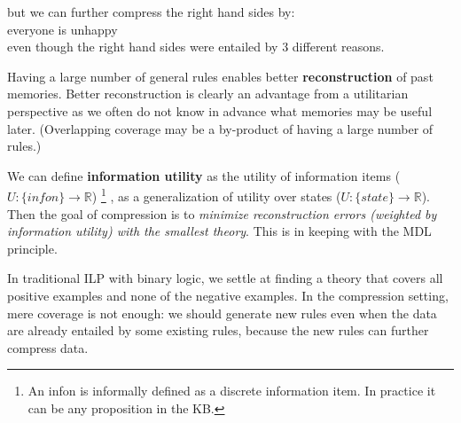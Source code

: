 but we can further compress the right hand sides by:\\
\hspace*{1cm} everyone is unhappy\\
even though the right hand sides were entailed by 3 different reasons.

Having a large number of general rules enables better \textbf{reconstruction} of past memories.  Better reconstruction is clearly an advantage from a utilitarian perspective as we often do not know in advance what memories may be useful later.  (Overlapping coverage may be a by-product of having a large number of rules.)

We can define \textbf{information utility} as the utility of information items ($U: \{ infon \} \rightarrow \mathbb{R}$)
\footnote{An infon is informally defined as a discrete information item.  In practice it can be any proposition in the KB.}
, as a generalization of utility over states ($U: \{ state \} \rightarrow \mathbb{R}$).  Then the goal of compression is to \textit{minimize reconstruction errors (weighted by information utility) with the smallest theory}.  This is in keeping with the MDL principle.



In traditional ILP with binary logic, we settle at finding a theory that covers all positive examples and none of the negative examples.  In the compression setting, mere coverage is not enough:  we should generate new rules even when the data are already entailed by some existing rules, because the new rules can further compress data.

